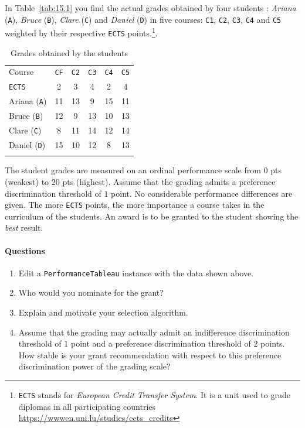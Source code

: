 In Table~\vref{tab:15.1} you find the actual grades obtained by four students : \emph{Ariana} (\texttt{A}), \emph{Bruce} (\texttt{B}), \emph{Clare} (\texttt{C}) and \emph{Daniel} (\texttt{D}) in five courses: \texttt{C1}, \texttt{C2}, \texttt{C3}, \texttt{C4} and \texttt{C5} weighted by their respective \texttt{ECTS} points.\footnote{\texttt{ECTS} stands for \emph{European Credit Transfer System}. It is a unit used to grade diplomas in all participating countries \href{https://wwwen.uni.lu/studies/ects\_credits}{https://wwwen.uni.lu/studies/ects\_credits}}. 
\begin{table}[ht]
\caption{Grades obtained by the students}
\label{tab:15.1}       %
\begin{center}
    \begin{tabular}{l|c|c|c|c|c}
      \svhline\noalign{\smallskip}
      Course & \texttt{CF} & \texttt{C2} & \texttt{C3} & \texttt{C4} & \texttt{C5}\\
      \texttt{ECTS}   & 2  & 3  & 4  & 2  & 4\\
      \noalign{\smallskip}\hline\noalign{\smallskip}
      Ariana (\texttt{A})  &  11 & 13 &   9 & 15 &  11\\
      Bruce (\texttt{B})   & 12  & 9  &  13 & 10 &  13\\
      Clare (\texttt{C})   &   8 & 11 &  14 & 12 &  14\\
      Daniel (\texttt{D})  &  15 & 10 &  12 &  8 &  13\\
      \noalign{\smallskip}\hline
    \end{tabular}
\end{center}
\end{table}
The student grades are measured on an ordinal performance scale from $0$ pts (weakest) to $20$ pts (highest). Assume that the grading admits a preference discrimination threshold of $1$ point. No considerable performance differences are given. The more \texttt{ECTS} points, the more importance a course takes in the curriculum of the students. An award is to be granted to the student showing the \emph{best} result.

\paragraph{\textbf{Questions}}

\begin{enumerate}
\item Edit a \texttt{PerformanceTableau} instance with the data shown above. 
\item Who would you nominate for the grant?
\item Explain and motivate your selection algorithm.
\item Assume that the grading may actually admit an indifference discrimination threshold of $1$ point and a preference discrimination threshold of $2$ points. How stable is your grant recommendation with respect to this preference discrimination power of the grading scale?
\end{enumerate}

